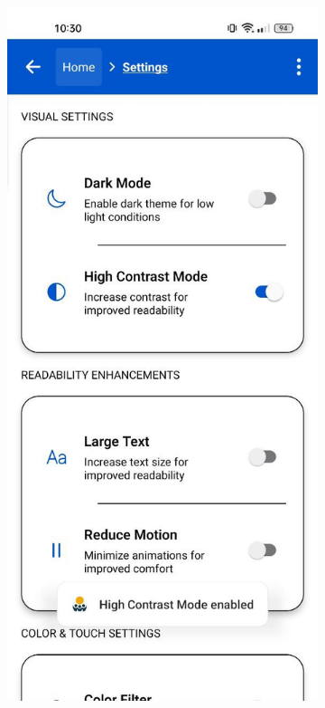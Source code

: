 \begin{figure}[ht]
    \centering
    \begin{subfigure}[b]{0.48\textwidth}
        \centering
        \includegraphics[width=\linewidth, alt={Settings screen with dark mode enabled}]{img/settings1.jpg}

\end{subfigure}
\end{figure}
